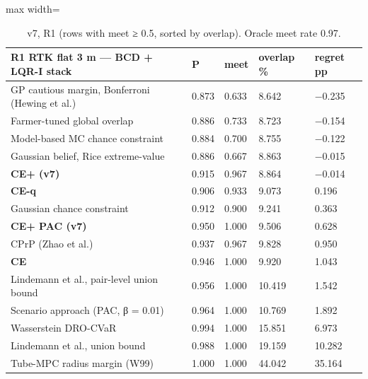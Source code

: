 \documentclass[preprint,12pt,authoryear]{elsarticle}
\begin{document}
\begin{table}[!htbp]
\centering
\footnotesize
\renewcommand{\thetable}{S1}\caption{v7, R1 (rows with meet ≥ 0.5, sorted by overlap). Oracle meet rate 0.97.}
\begin{adjustbox}{max width=\textwidth}
\begin{tabular}{@{}>{\raggedright\arraybackslash}p{20.8em}llll@{}}
\toprule
\textbf{R1 RTK flat 3 m --- BCD + LQR-I stack} & \textbf{P} & \textbf{meet} & \textbf{overlap \%} & \textbf{regret pp} \\
\midrule
GP cautious margin, Bonferroni (Hewing et al.) & 0.873 & 0.633 & 8.642 & −0.235 \\
Farmer-tuned global overlap & 0.886 & 0.733 & 8.723 & −0.154 \\
Model-based MC chance constraint & 0.884 & 0.700 & 8.755 & −0.122 \\
Gaussian belief, Rice extreme-value & 0.886 & 0.667 & 8.863 & −0.015 \\
\textbf{CE+ (v7)} & 0.915 & 0.967 & 8.864 & −0.014 \\
\textbf{CE-q} & 0.906 & 0.933 & 9.073 & 0.196 \\
Gaussian chance constraint & 0.912 & 0.900 & 9.241 & 0.363 \\
\textbf{CE+ PAC (v7)} & 0.950 & 1.000 & 9.506 & 0.628 \\
CPrP (Zhao et al.) & 0.937 & 0.967 & 9.828 & 0.950 \\
\textbf{CE} & 0.946 & 1.000 & 9.920 & 1.043 \\
Lindemann et al., pair-level union bound & 0.956 & 1.000 & 10.419 & 1.542 \\
Scenario approach (PAC, β = 0.01) & 0.964 & 1.000 & 10.769 & 1.892 \\
Wasserstein DRO-CVaR & 0.994 & 1.000 & 15.851 & 6.973 \\
Lindemann et al., union bound & 0.988 & 1.000 & 19.159 & 10.282 \\
Tube-MPC radius margin (W99) & 1.000 & 1.000 & 44.042 & 35.164 \\
\bottomrule
\end{tabular}
\end{adjustbox}
\end{table}
\end{document}
